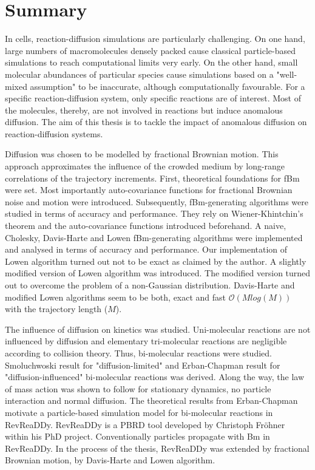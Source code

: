 \documentclass[
  a4paper,BCOR10mm,twoside,
  headsepline,footsepline,%
  fleqn,openbib
]{scrbook}
\begin{document}
\chapter{Summary}
In cells, reaction-diffusion simulations are particularly challenging. On one hand, large numbers of macromolecules densely packed cause classical particle-based simulations to reach computational limits very early.  On the other hand, small molecular abundances of particular species cause simulations based on a "well-mixed assumption" to be inaccurate, although computationally favourable. For a specific reaction-diffusion system, only specific reactions are of interest. Most of the molecules, thereby, are not involved in reactions but induce anomalous diffusion. The aim of this thesis is to tackle the impact of anomalous diffusion on reaction-diffusion systems. \par
Diffusion was chosen to be modelled by fractional Brownian motion. This approach approximates the influence of the crowded medium by long-range correlations of the trajectory increments. First, theoretical foundations for fBm were set. Most importantly auto-covariance functions for fractional Brownian noise and motion were introduced. Subsequently, fBm-generating algorithms were studied in terms of accuracy and performance. They rely on Wiener-Khintchin's theorem and the auto-covariance functions introduced beforehand. A naive, Cholesky, Davis-Harte and Lowen fBm-generating algorithms were implemented and analysed in terms of accuracy and performance. Our implementation of Lowen algorithm turned out not to be exact as claimed by the author\cite{Lowen1999}. A slightly modified version of Lowen algorithm was introduced. The modified version turned out to overcome the problem of a non-Gaussian distribution. Davis-Harte and modified Lowen algorithms seem to be both, exact and fast $\mathcal{O}(M log(M))$ with the trajectory length ($M$).\par
The influence of diffusion on kinetics was studied. Uni-molecular reactions are not influenced by diffusion and elementary tri-molecular reactions are negligible according to collision theory. Thus, bi-molecular reactions were studied. Smoluchwoski result for "diffusion-limited" and Erban-Chapman result for "diffusion-influenced" bi-molecular reactions was derived. Along the way, the law of mass action was shown to follow for stationary dynamics, no particle interaction and normal diffusion. The theoretical results from Erban-Chapman motivate a particle-based simulation model for bi-molecular reactions in RevReaDDy. RevReaDDy is a PBRD tool developed by Christoph Fröhner within his PhD project. Conventionally particles propagate with Bm in RevReaDDy. In the process of the thesis, RevReaDDy was extended by fractional Brownian motion, by Davis-Harte and Lowen algorithm.
\end{document}
